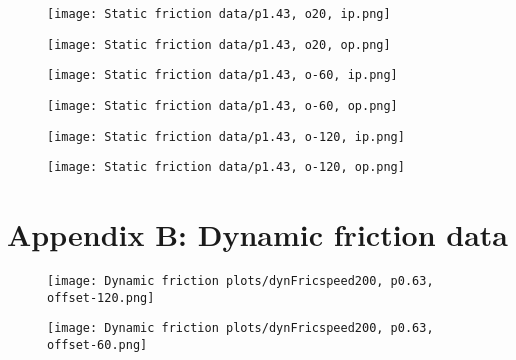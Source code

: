 \documentclass[12pt]{article}
\begin{document}
\begin{figure}[!h]
    \centering
    \begin{minipage}{0.49\textwidth}       
         \texttt{[image: Static friction data/p1.43, o20, ip.png]}
    \end{minipage}
    \begin{minipage}{0.49\textwidth}       
         \texttt{[image: Static friction data/p1.43, o20, op.png]}
    \end{minipage}

\end{figure}
\begin{figure}[!h]
    \centering
    \begin{minipage}{0.49\textwidth}       
         \texttt{[image: Static friction data/p1.43, o-60, ip.png]}
    \end{minipage}
    \begin{minipage}{0.49\textwidth}       
         \texttt{[image: Static friction data/p1.43, o-60, op.png]}
    \end{minipage}

\end{figure}
\begin{figure}[!h]
    \centering
    \begin{minipage}{0.49\textwidth}       
         \texttt{[image: Static friction data/p1.43, o-120, ip.png]}
    \end{minipage}
    \begin{minipage}{0.49\textwidth}       
         \texttt{[image: Static friction data/p1.43, o-120, op.png]}
    \end{minipage}

\end{figure}

\clearpage
{}
\section*{Appendix B: Dynamic friction data}
%
\setlength{\floatsep}{0.1pt}

\begin{figure}[!h]
    \centering
    \begin{minipage}{0.49\textwidth}       
         \texttt{[image: Dynamic friction plots/dynFricspeed200, p0.63, offset-120.png]}
    \end{minipage}
    \begin{minipage}{0.49\textwidth}       
         \texttt{[image: Dynamic friction plots/dynFricspeed200, p0.63, offset-60.png]}
    \end{minipage}

\end{figure}
\end{document}
